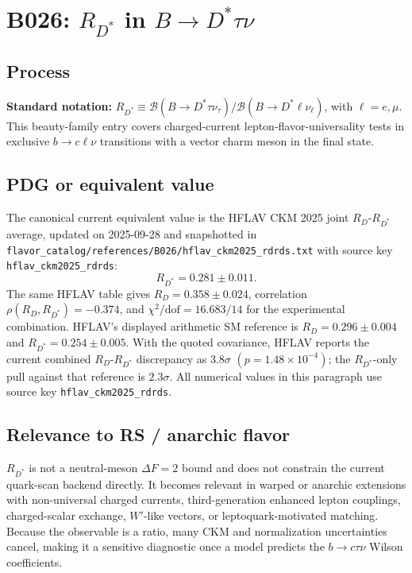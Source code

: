 
\section{B026: \(R_{D^*}\) in \(B\to D^*\tau\nu\)}

\subsection*{Process}
\textbf{Standard notation:} \(R_{D^*}\equiv
\mathcal{B}(B\to D^*\tau\nu_\tau)/
\mathcal{B}(B\to D^*\ell\nu_\ell)\), with \(\ell=e,\mu\).  This
beauty-family entry covers charged-current lepton-flavor-universality tests in
exclusive \(b\to c\ell\nu\) transitions with a vector charm meson in the final
state.

\subsection*{PDG or equivalent value}
The canonical current equivalent value is the HFLAV CKM 2025 joint
\(R_D\)-\(R_{D^*}\) average, updated on 2025-09-28 and snapshotted in
\texttt{flavor\_catalog/references/B026/hflav\_ckm2025\_rdrds.txt} with source
key \texttt{hflav\_ckm2025\_rdrds}:
\[
  R_{D^*}=0.281\pm0.011 .
\]
The same HFLAV table gives \(R_D=0.358\pm0.024\), correlation
\(\rho(R_D,R_{D^*})=-0.374\), and
\(\chi^2/\mathrm{dof}=16.683/14\) for the experimental combination.  HFLAV's
displayed arithmetic SM reference is \(R_D=0.296\pm0.004\) and
\(R_{D^*}=0.254\pm0.005\).  With the quoted covariance, HFLAV reports the
current combined \(R_D\)-\(R_{D^*}\) discrepancy as \(3.8\sigma\)
\((p=1.48\times10^{-4})\); the \(R_{D^*}\)-only pull against that reference is
\(2.3\sigma\).  All numerical values in this paragraph use source key
\texttt{hflav\_ckm2025\_rdrds}.

\subsection*{Relevance to RS / anarchic flavor}
\(R_{D^*}\) is not a neutral-meson \(\Delta F=2\) bound and does not constrain
the current quark-scan backend directly.  It becomes relevant in warped or
anarchic extensions with non-universal charged currents, third-generation
enhanced lepton couplings, charged-scalar exchange, \(W'\)-like vectors, or
leptoquark-motivated matching.  Because the observable is a ratio, many CKM and
normalization uncertainties cancel, making it a sensitive diagnostic once a
model predicts the \(b\to c\tau\nu\) Wilson coefficients.

